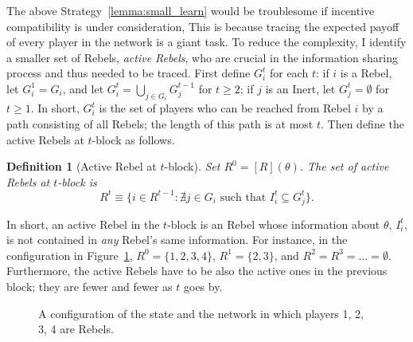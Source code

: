 \documentclass[12pt,letter]{article}
\newtheorem{definition}{Definition}[section]
\theoremstyle{definition}
\theoremstyle{remark}
\theoremstyle{claim}
\begin{document}
The above Strategy~\ref{lemma:small_learn} would be troublesome if incentive compatibility is under consideration, This is because tracing the expected payoff of every player in the network is a giant task. To reduce the complexity, I identify a smaller set of Rebels, \textit{active Rebels}, who are crucial in the information sharing process and thus needed to be traced. First define $G^t_i$ for each $t$: if $i$ is a Rebel, let $G^1_i= G_i$, and let $G^t_i= \bigcup_{j\in G_i} G^{t-1}_j$ for $t\geq 2$; if $j$ is an Inert, let $G^t_j=\emptyset$ for $t\geq 1$. In short, $G^t_i$ is the set of players who can be reached from Rebel $i$ by a path consisting of all Rebels; the length of this path is at most $t$. Then define the active Rebels at $t$-block as follows.
\begin{definition}[Active Rebel at $t$-block]
Set $R^0=[R](\theta)$. The set of active Rebels at $t$-block is 
\[\text{$R^t\equiv \{i\in R^{t-1}: \nexists j\in G_i \text{ such that }I^t_i\subseteq G^t_j\}$}.\]

\end{definition}
In short, an active Rebel in the $t$-block is an Rebel whose information about $\theta$, $I^t_i$, is not contained in \textit{any} Rebel's same information. For instance, in the configuration in Figure~\ref{fig:T-round-4}, $R^0=\{1,2,3,4\}$, $R^1=\{2,3\}$, and $R^2=R^3=...=\emptyset$. Furthermore, the active Rebels have to be also the active ones in the previous block; they are fewer and fewer as $t$ goes by. 

\begin{figure}

\begin{center}
\end{center}
\caption{A configuration of the state and the network in which players 1, 2, 3, 4 are Rebels.}
\label{fig:T-round-4}
\end{figure}
\end{document}
